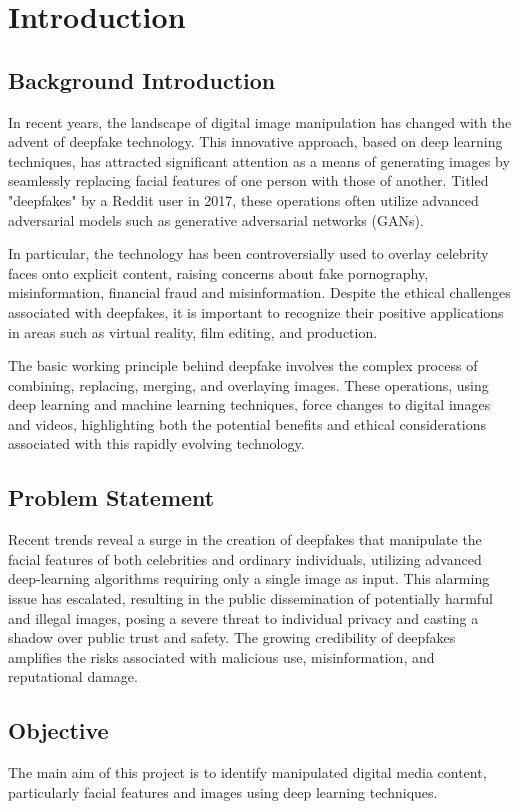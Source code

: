\chapter{Introduction}
    \section{Background Introduction}
        In recent years, the landscape of digital image manipulation has changed with the advent of deepfake technology.
        This innovative approach, based on deep learning techniques, has attracted significant attention as a means of generating images by seamlessly replacing facial features of one person with those of another.
        Titled "deepfakes" by a Reddit user in 2017, these operations often utilize advanced adversarial models such as generative adversarial networks (GANs).

        In particular, the technology has been controversially used to overlay celebrity faces onto explicit content, raising concerns about fake pornography, misinformation, financial fraud and misinformation.
        Despite the ethical challenges associated with deepfakes, it is important to recognize their positive applications in areas such as virtual reality, film editing, and production.

        The basic working principle behind deepfake involves the complex process of combining, replacing, merging,  and overlaying images.
        These operations, using deep learning and machine learning techniques, force changes to digital images and videos, highlighting both the potential benefits and ethical considerations associated with this rapidly evolving technology.


    \section{Problem Statement}
        Recent trends reveal a surge in the creation of deepfakes that manipulate the facial features of both celebrities and ordinary individuals, utilizing advanced deep-learning algorithms requiring only a single image as input. This alarming issue has escalated, resulting in the public dissemination of potentially harmful and illegal images, posing a severe threat to individual privacy and casting a shadow over public trust and safety. The growing credibility of deepfakes amplifies the risks associated with malicious use, misinformation, and reputational damage.

    \section{Objective}
        The main aim of this project is to identify manipulated digital media content, particularly facial features and images using deep learning techniques.